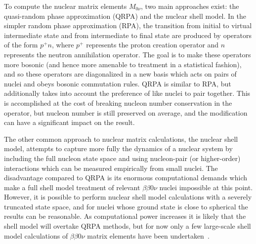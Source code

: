 
To compute the nuclear matrix elements $M_{0\nu}$, two main approaches exist: the quasi-random phase approximation (QRPA) and the nuclear shell model.  In the simpler random phase approximation (RPA), the transition from initial to virtual intermediate state and from intermediate to final state are produced by operators of the form $p^+ n$, where $p^+$ represents the proton creation operator and $n$ represents the neutron annihilation operator.  The goal is to make these operators more bosonic (and hence more amenable to treatment in a statistical fashion), and so these operators are diagonalized in a new basis which acts on pairs of nuclei and obeys bosonic commutation rules.  QRPA is similar to RPA, but additionally takes into account the preference of like nuclei to pair together.  This is accomplished at the cost of breaking nucleon number conservation in the operator, but nucleon number is still preserved on average, and the modification can have a significant impact on the result.~\cite{RMPbb0n}

The other common approach to nuclear matrix calculations, the nuclear shell model, attempts to capture more fully the dynamics of a nuclear system by including the full nucleon state space and using nucleon-pair (or higher-order) interactions which can be measured empirically from small nuclei.  The disadvantage compared to QRPA is its enormous computational demands which make a full shell model treatment of relevant $\beta\beta 0\nu$ nuclei impossible at this point.  However, it is possible to perform nuclear shell model calculations with a severely truncated state space, and for nuclei whose ground state is close to spherical the results can be reasonable.  As computational power increases it is likely that the shell model will overtake QRPA methods, but for now only a few large-scale shell model calculations of $\beta\beta 0\nu$ matrix elements have been undertaken~\cite{RMPbb0n}.

